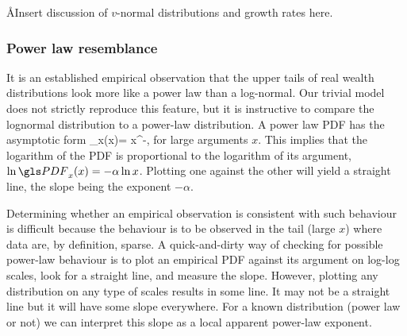 \AA{Insert discussion of $v$-normal distributions and growth rates here.}


\subsubsection{Power law resemblance}
It is an established empirical observation \cite{Newman2005} that the upper tails of 
real wealth distributions look more like a power law than a log-normal. Our trivial model does not
strictly reproduce this feature, but it is instructive to compare the lognormal distribution
to a power-law distribution. A power law PDF has the asymptotic form 
\be
\PDF_x(x)= x^{-\alpha},
\ee
for large arguments $x$. This implies that the logarithm of the PDF is proportional 
to the logarithm of its argument, $\ln \PDF_x(x) = -\alpha \ln x$. Plotting
one against the other will yield a straight line, the slope being the exponent $-\alpha$. 

Determining whether an empirical observation is consistent with such behaviour 
is difficult because the behaviour is to be observed in the tail (large $x$) where data are,
by definition, sparse. A quick-and-dirty way of checking for possible power-law 
behaviour is to plot an empirical PDF against its argument on log-log scales, 
look for a straight line, and measure the slope. However, plotting any distribution on any 
type of scales results in some line. It may not be a straight line but it will have some slope 
everywhere. For a known distribution (power law or not) we can interpret this slope 
as a local apparent power-law exponent. 

